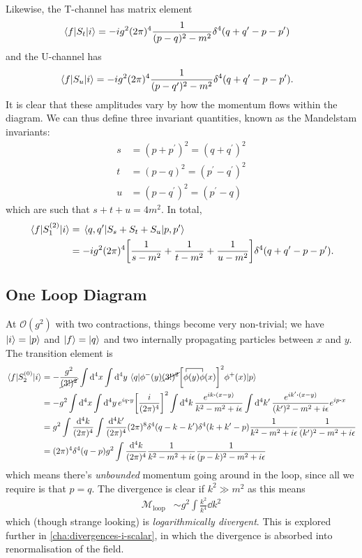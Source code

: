 \documentclass[notes.tex]{subfiles}
\begin{document}
Likewise, the T-channel has matrix element
\begin{align*}
	\mel{f}{S_t}{i} &= -ig^2(2\pi)^4\frac{1}{(p-q)^2 - m^2} \delta^4(q+q^\prime - p - p^\prime)
\end{align*}
and the U-channel has
\begin{align*}
	\mel{f}{S_u}{i} &= -ig^2(2\pi)^4\frac{1}{(p-q^\prime)^2 - m^2} \delta^4(q+q^\prime - p - p^\prime).
\end{align*}
It is clear that these amplitudes vary by how the momentum flows within the diagram. 
We can thus define three invariant quantities, known as the Mandelstam invariants:
\begin{align*}
	s &= (p+p^\prime)^2 = (q+q^\prime)^2\\
	t &= (p-q)^2 = (p^\prime - q^\prime)^2\\
	u &= (p-q^\prime)^2 = (p^\prime-q) 
\end{align*}
which are such that $s+t+u=4m^2$.
In total,
\begin{align*}
	\mel{f}{S_1^{(2)}}{i} &= \mel{q, q^\prime}{S_s + S_t + S_u}{p, p^\prime}\\
	&= -ig^2(2\pi)^4\qty[\frac{1}{s - m^2} + \frac{1}{t - m^2} + \frac{1}{u - m^2}] \delta^4(q + q^\prime - p - p^\prime).
\end{align*}
\subsection{One Loop Diagram}
At $\mathcal{O}(g^2)$ with two contractions, things become very non-trivial; we have $\ket{i}=\ket{p}$ and $\ket{f}=\ket{q}$ and two internally propagating particles between $x$ and $y$.
The transition element is
\begin{align*}
	\mel{f}{S^{(0)}_{2}}{i} &= - \frac{g^2}{\cancel{(3!)^2}}\int\dd[4]{x} \int\dd[4]{y} \mel{q}{\phi^-(y)\cancel{(3!)^2} \qty[\contraction{}{\phi}{(y)}{\phi}\phi(y)\phi(x)]^2\phi^+(x)}{p}\\
	&= -g^2 \int\dd[4]{x} \int\dd[4]{y} e^{iq\vdot{}y} \qty[\frac{i}{(2\pi)^4}]^2\int \dd[4]{k} \frac{e^{ik\vdot{}(x-y)}}{k^2-m^2+i\epsilon} \int \dd[4]{k^\prime} \frac{e^{ik^\prime\vdot{}(x-y)}}{(k^\prime)^2-m^2+i\epsilon} e^{ip\vdot{x}}\\
	&= g^2 \int \frac{\dd[4]{k}}{(2\pi)^4}\int \frac{\dd[4]{k^\prime}}{(2\pi)^4} (2\pi)^8 \delta^4(q-k-k^\prime)\delta^4(k+k^\prime - p) \frac{1}{k^2-m^2+i\epsilon} \frac{1}{(k^\prime)^2-m^2+i\epsilon}\\
	&= (2\pi)^4 \delta^4(q-p) g^2 \int \frac{\dd[4]{k}}{(2\pi)^4} \frac{1}{k^2-m^2+i\epsilon} \frac{1}{(p-k)^2-m^2+i\epsilon}
\end{align*}
which means there's \emph{unbounded} momentum going around in the loop, since all we require is that $p=q$. 
The divergence is clear if $k^2 \gg m^2$ as this means
\begin{align*}
	\mathcal{M}_\text{loop} &\sim g^2 \int \frac{k^2}{k^4}\dd{k^2}
\end{align*}
which (though strange looking) is \emph{logarithmically divergent}.
This is explored further in \autoref{cha:divergences-i-scalar}, in which the divergence is absorbed into renormalisation of the field.
\end{document}
